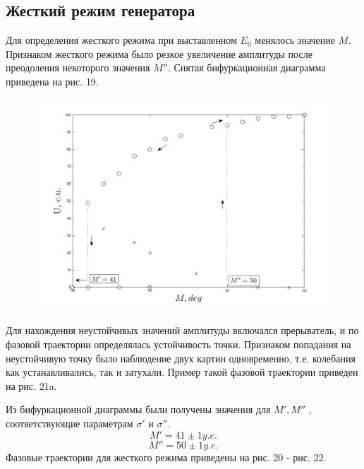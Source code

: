 \subsection{Жесткий режим генератора}

Для определения жесткого режима при выставленном $E_0$ менялось значение $M$. Признаком жесткого режима было
 резкое увеличение амплитуды после преодоления некоторого значения $M''$.
Снятая бифуркационная диаграмма приведена на рис. 19.
\begin{center}
    \begin{figure}[H]
        \vspace{-10pt}
            \includegraphics[width=\linewidth]{graph/g2.png} 
            \vspace{-10pt}
            \label{fig:10}
            \vspace{-40pt}
    \end{figure}
\end{center} 
Для нахождения неустойчивых значений амплитуды включался прерыватель, и по фазовой траектории определялась устойчивость точки.
Признаком попадания на неустойчивую точку было наблюдение двух картин одновременно, т.е. колебания как устанавливались, так и затухали.
 Пример такой фазовой траектории приведен на рис. 21a.


 Из бифуркационной диаграммы были получены значения для $M',M''$ , соответствующие параметрам $\sigma'$ и $\sigma''$.
$$M'=  41 \pm 1 y.e.$$ $$M''= 50 \pm 1 y.e.$$
Фазовые траектории для жесткого режима приведены на рис. 20 - рис. 22.


